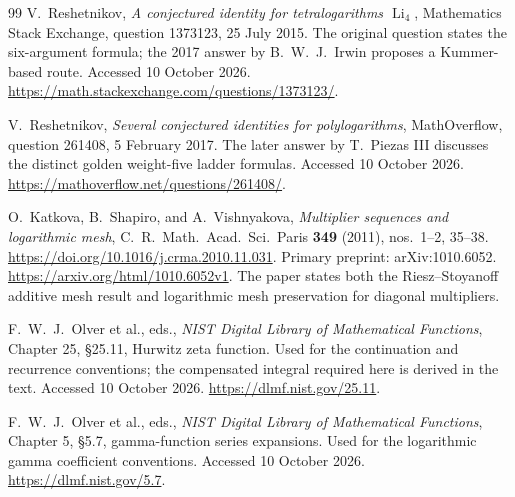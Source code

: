 \begin{thebibliography}{99}
V.~Reshetnikov,
\emph{A conjectured identity for tetralogarithms $\operatorname{Li}_4$},
Mathematics Stack Exchange, question 1373123, 25 July 2015.
The original question states the six-argument formula; the 2017
answer by B.~W.~J.~Irwin proposes a Kummer-based route.
Accessed 10 October 2026.
\url{https://math.stackexchange.com/questions/1373123/}.

V.~Reshetnikov,
\emph{Several conjectured identities for polylogarithms},
MathOverflow, question 261408, 5 February 2017.
The later answer by T.~Piezas III discusses the distinct golden
weight-five ladder formulas. Accessed 10 October 2026.
\url{https://mathoverflow.net/questions/261408/}.

O.~Katkova, B.~Shapiro, and A.~Vishnyakova,
\emph{Multiplier sequences and logarithmic mesh},
C.~R.~Math.~Acad.~Sci.~Paris \textbf{349} (2011), nos.~1--2, 35--38.
\url{https://doi.org/10.1016/j.crma.2010.11.031}.
Primary preprint: arXiv:1010.6052.
\url{https://arxiv.org/html/1010.6052v1}.
The paper states both the Riesz--Stoyanoff additive mesh result
and logarithmic mesh preservation for diagonal multipliers.

F.~W.~J.~Olver et al., eds.,
\emph{NIST Digital Library of Mathematical Functions},
Chapter 25, \S25.11, Hurwitz zeta function.
Used for the continuation and recurrence conventions; the compensated
integral required here is derived in the text.
Accessed 10 October 2026.
\url{https://dlmf.nist.gov/25.11}.

F.~W.~J.~Olver et al., eds.,
\emph{NIST Digital Library of Mathematical Functions},
Chapter 5, \S5.7, gamma-function series expansions.
Used for the logarithmic gamma coefficient conventions.
Accessed 10 October 2026.
\url{https://dlmf.nist.gov/5.7}.

\end{thebibliography}
